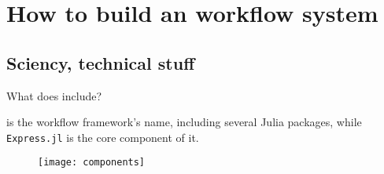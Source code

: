 \section{How to build an \ab{} workflow system}

\subsection{Sciency, technical stuff}

\begin{frame}[allowframebreaks]{What does \express{} include?}

    \express{} is the workflow framework's name, including several Julia packages,
    while \texttt{Express.jl} is the core component of it.

    \begin{figure}
        \centering
        \texttt{[image: components]}
        \label{fig:components}
    \end{figure}


\end{frame}
